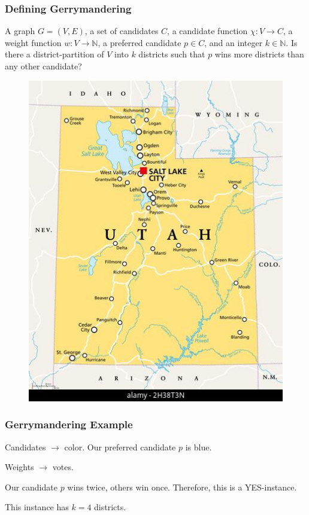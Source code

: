 \begin{frame}[t]
	\frametitle{Defining Gerrymandering}
	\small
	{A graph $G = (V,E)$, a set of candidates $C$, a candidate function $\chi: V \rightarrow C$, a weight function $w: V \rightarrow \mathbb{N}$, a preferred candidate $p \in C$, and an integer $k \in \mathbb{N}$.}
	{Is there a district-partition of $V$ into $k$ districts such that $p$ wins more districts than any other candidate?}

	 {
			\begin{figure}
				\begin{center}
					\includegraphics[scale=0.15]{figures/ut.jpg}
					
				\end{center}
			\end{figure}
	}
\end{frame}

\begin{frame}[t]
	\frametitle{Gerrymandering Example}
	\begin{figure}
		\begin{center}
			
		\end{center}
	\end{figure}

	\begin{itemize}
		\item Candidates $\rightarrow$ color. Our preferred candidate $p$ is blue.
		\item Weights $\rightarrow$ votes.
		\onslide<3> {
			\item Our candidate $p$ wins twice, others win once. Therefore, this is a YES-instance.
			\item This instance has $k=4$ districts.
		}
	\end{itemize}
\end{frame}